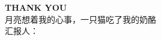 {
\begin{frame}[plain]
\vfill
\begin{center}
  {\Huge\textbf{\color{yantex@main} THANK YOU}}\\[1.2em]
  
  {\Large 月亮想着我的心事，一只猫吃了我的奶酪}\\[2em]
  
  {\normalsize\color{yantex@darkgray} 汇报人：\insertauthor}
\end{center}
\vfill
\end{frame}
}
